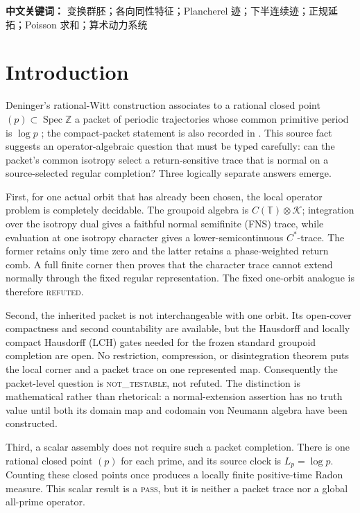 \documentclass[11pt]{article}
\theoremstyle{definition}
\newcommand{\Z}{\mathbb{Z}}
\newcommand{\T}{\mathbb{T}}
\newcommand{\K}{\mathcal{K}}
\newcommand{\NOTTESTABLE}{\textsc{not\_testable}}
\newcommand{\REFUTED}{\textsc{refuted}}
\newcommand{\PASS}{\textsc{pass}}
\begin{document}
\medskip
\noindent\textbf{中文关键词：} 变换群胚；各向同性特征；Plancherel 迹；下半连续迹；正规延拓；Poisson 求和；算术动力系统

\tableofcontents

\section{Introduction}

Deninger's rational-Witt construction associates to a rational closed point \((p)\subset\operatorname{Spec}\Z\) a packet of periodic trajectories whose common primitive period is \(\log p\) \cite[Section~6 and Theorem~6.1, arXiv-v4 pp.~38--39]{Deninger2026}; the compact-packet statement is also recorded in \cite[Theorem~4.2, arXiv-v1 pp.~11--12]{Deninger2023}.  This source fact suggests an operator-algebraic question that must be typed carefully: can the packet's common isotropy select a return-sensitive trace that is normal on a source-selected regular completion?  Three logically separate answers emerge.

First, for one actual orbit that has already been chosen, the local operator problem is completely decidable.  The groupoid algebra is \(C(\T)\otimes\K\); integration over the isotropy dual gives a faithful normal semifinite (FNS) trace, while evaluation at one isotropy character gives a lower-semicontinuous \(C^*\)-trace.  The former retains only time zero and the latter retains a phase-weighted return comb.  A full finite corner then proves that the character trace cannot extend normally through the fixed regular representation.  The fixed one-orbit analogue is therefore \REFUTED.

Second, the inherited packet is not interchangeable with one orbit.  Its open-cover compactness and second countability are available, but the Hausdorff and locally compact Hausdorff (LCH) gates needed for the frozen standard groupoid completion are open.  No restriction, compression, or disintegration theorem puts the local corner and a packet trace on one represented map.  Consequently the packet-level question is \NOTTESTABLE, not refuted.  The distinction is mathematical rather than rhetorical: a normal-extension assertion has no truth value until both its domain map and codomain von Neumann algebra have been constructed.

Third, a scalar assembly does not require such a packet completion.  There is one rational closed point \((p)\) for each prime, and its source clock is \(L_p=\log p\).  Counting these closed points once produces a locally finite positive-time Radon measure.  This scalar result is a \PASS, but it is neither a packet trace nor a global all-prime operator.
\end{document}
